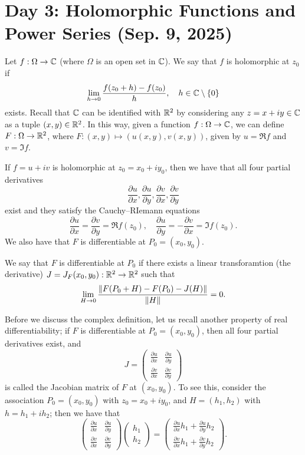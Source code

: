 \section{Day 3: Holomorphic Functions and Power Series (Sep. 9, 2025)}
Let $f : \Omega \to \mathbb C$ (where $\Omega$ is an open set in $\mathbb C$). We say that $f$ is holomorphic at $z_0$ if
\[ \lim_{h \to 0} \frac{f(z_0 + h) - f(z_0)}{h}, \quad h \in \mathbb C \setminus \{0\} \]
exists. Recall that $\mathbb C$ can be identified with $\mathbb R^2$ by considering any $z = x + iy \in \mathbb C$ as a tuple $(x, y) \in \mathbb R^2$. In this way, given a function $f : \Omega \to \mathbb C$, we can define $F : \Omega \to \mathbb R^2$, where $F : (x, y) \mapsto (u(x, y), v(x, y))$, given by $u = \Re f$ and $v = \Im f$.
\begin{proposition}
    If $f = u + iv$ is holomorphic at $z_0 = x_0 + iy_0$, then we have that all four partial derivatives
    \[ \frac{\partial u}{\partial x}, \frac{\partial u}{\partial y}, \frac{\partial v}{\partial x}, \frac{\partial v}{\partial y} \]
    exist and they satisfy the Cauchy--RIemann equations
    \[ \frac{\partial u}{\partial x} = \frac{\partial v}{\partial y} = \Re f(z_0), \quad \frac{\partial u}{\partial y} = -\frac{\partial v}{\partial x} = \Im f(z_0). \]
    We also have that $F$ is differentiable at $P_0 = (x_0, y_0)$.
\end{proposition}
\begin{definition}
    We say that $F$ is differentiable at $P_0$ if there exists a linear transforamtion (the derivative) $J = J_F(x_0, y_0) : \mathbb R^2 \to \mathbb R^2$ such that
    \[ \lim_{H \to 0} \frac{\left\lVert F(P_0 + H) - F(P_0) - J(H) \right\rVert}{\left\lVert H \right\rVert} = 0. \]
\end{definition}
\noindent Before we discuss the complex definition, let us recall another property of real differentiability; if $F$ is differentiable at $P_0 = (x_0, y_0)$, then all four partial derivatives exist, and
\[ J = \begin{pmatrix} \frac{\partial u}{\partial x} & \frac{\partial u}{\partial y} \\ \frac{\partial v}{\partial x} & \frac{\partial v}{\partial y} \end{pmatrix} \]
is called the Jacobian matrix of $F$ at $(x_0, y_0)$. To see this, consider the association $P_0 = (x_0, y_0)$ with $z_0 = x_0 + iy_0$, and $H = (h_1, h_2)$ with $h = h_1 + ih_2$; then we have that
\[ \begin{pmatrix} \frac{\partial u}{\partial x} & \frac{\partial u}{\partial y} \\ \frac{\partial v}{\partial x} & \frac{\partial v}{\partial y} \end{pmatrix} \begin{pmatrix} h_1 \\ h_2 \end{pmatrix} = \begin{pmatrix} \frac{\partial u}{\partial x} h_1 + \frac{\partial u}{\partial y} h_2 \\ \frac{\partial v}{\partial x} h_1 + \frac{\partial v}{\partial y} h_2 \end{pmatrix}. \]
